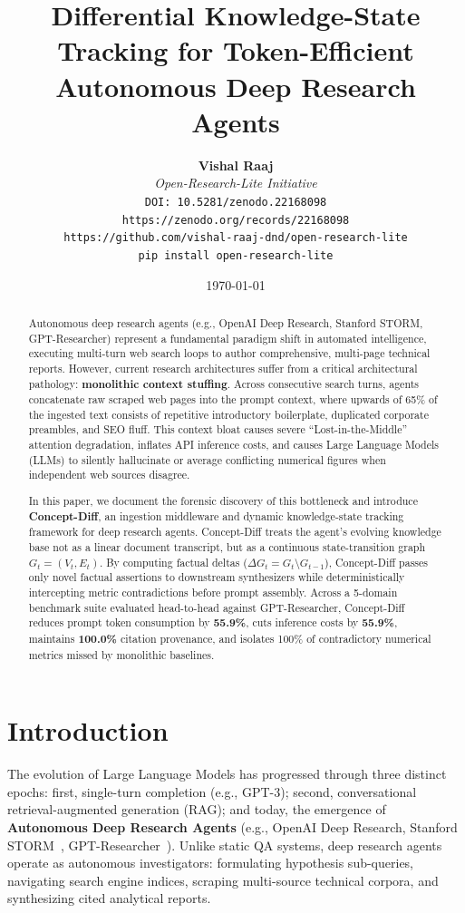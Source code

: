 \documentclass[10pt,twocolumn,letterpaper]{article}
\title{\textbf{Differential Knowledge-State Tracking for Token-Efficient Autonomous Deep Research Agents}}
\author{
  \textbf{Vishal Raaj} \\
  \textit{Open-Research-Lite Initiative} \\
  \texttt{DOI: 10.5281/zenodo.22168098} \\
  \texttt{https://zenodo.org/records/22168098} \\
  \texttt{https://github.com/vishal-raaj-dnd/open-research-lite} \\
  \texttt{pip install open-research-lite}
}
\date{\today}
\begin{document}
\maketitle

\begin{abstract}
Autonomous deep research agents (e.g., OpenAI Deep Research, Stanford STORM, GPT-Researcher) represent a fundamental paradigm shift in automated intelligence, executing multi-turn web search loops to author comprehensive, multi-page technical reports. However, current research architectures suffer from a critical architectural pathology: \textbf{monolithic context stuffing}. Across consecutive search turns, agents concatenate raw scraped web pages into the prompt context, where upwards of 65\% of the ingested text consists of repetitive introductory boilerplate, duplicated corporate preambles, and SEO fluff. This context bloat causes severe ``Lost-in-the-Middle'' attention degradation, inflates API inference costs, and causes Large Language Models (LLMs) to silently hallucinate or average conflicting numerical figures when independent web sources disagree.

In this paper, we document the forensic discovery of this bottleneck and introduce \textbf{Concept-Diff}, an ingestion middleware and dynamic knowledge-state tracking framework for deep research agents. Concept-Diff treats the agent's evolving knowledge base not as a linear document transcript, but as a continuous state-transition graph $G_t = (V_t, E_t)$. By computing factual deltas ($\Delta G_t = G_t \setminus G_{t-1}$), Concept-Diff passes only novel factual assertions to downstream synthesizers while deterministically intercepting metric contradictions before prompt assembly. Across a 5-domain benchmark suite evaluated head-to-head against GPT-Researcher, Concept-Diff reduces prompt token consumption by \textbf{55.9\%}, cuts inference costs by \textbf{55.9\%}, maintains \textbf{100.0\%} citation provenance, and isolates 100\% of contradictory numerical metrics missed by monolithic baselines.
\end{abstract}

\section{Introduction}
The evolution of Large Language Models has progressed through three distinct epochs: first, single-turn completion (e.g., GPT-3); second, conversational retrieval-augmented generation (RAG); and today, the emergence of \textbf{Autonomous Deep Research Agents} (e.g., OpenAI Deep Research, Stanford STORM~\cite{shao2024storm}, GPT-Researcher~\cite{elovic2024gptr}). Unlike static QA systems, deep research agents operate as autonomous investigators: formulating hypothesis sub-queries, navigating search engine indices, scraping multi-source technical corpora, and synthesizing cited analytical reports.
\end{document}
